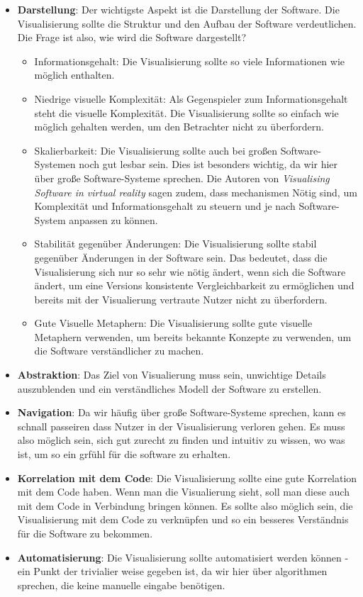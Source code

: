 \begin{itemize}
    \item \textbf{Darstellung}: Der wichtigste Aspekt ist die Darstellung der Software. Die Visualisierung sollte die Struktur und den Aufbau der Software verdeutlichen. Die Frage ist also, wie wird die Software dargestellt? 
    \begin{itemize}
        \item Informationsgehalt: Die Visualisierung sollte so viele Informationen wie möglich enthalten.
        \item Niedrige visuelle Komplexität: Als Gegenspieler zum Informationsgehalt steht die visuelle Komplexität. Die Visualisierung sollte so einfach wie möglich gehalten werden, um den Betrachter nicht zu überfordern.
        \item Skalierbarkeit: Die Visualisierung sollte auch bei großen Software-Systemen noch gut lesbar sein. Dies ist besonders wichtig, da wir hier über große Software-Systeme sprechen. Die Autoren von \textit{Visualising Software in virtual reality} \cite{visSoftwareVR} sagen zudem, dass mechanismen Nötig sind, um Komplexität und Informationsgehalt zu steuern und je nach Software-System anpassen zu können.
        \item Stabilität gegenüber Änderungen: Die Visualisierung sollte stabil gegenüber Änderungen in der Software sein. Das bedeutet, dass die Visualisierung sich nur so sehr wie nötig ändert, wenn sich die Software ändert, um eine Versions konsistente Vergleichbarkeit zu ermöglichen und bereits mit der Visualierung vertraute Nutzer nicht zu überfordern.
        \item Gute Visuelle Metaphern: Die Visualisierung sollte gute visuelle Metaphern verwenden, um bereits bekannte Konzepte zu verwenden, um die Software verständlicher zu machen.
    \end{itemize}
    \item \textbf{Abstraktion}: Das Ziel von Visualierung muss sein, unwichtige Details auszublenden und ein verständliches Modell der Software zu erstellen.
    \item \textbf{Navigation}: Da wir häufig über große Software-Systeme sprechen, kann es schnall passeiren dass Nutzer in der Visualisierung verloren gehen. Es muss also möglich sein, sich gut zurecht zu finden und intuitiv zu wissen, wo was ist, um so ein grfühl für die software zu erhalten.
    \item \textbf{Korrelation mit dem Code}: Die Visualisierung sollte eine gute Korrelation mit dem Code haben. Wenn man die Visualierung sieht, soll man diese auch mit dem Code in Verbindung bringen können. Es sollte also möglich sein, die Visualisierung mit dem Code zu verknüpfen und so ein besseres Verständnis für die Software zu bekommen.
    \item \textbf{Automatisierung}: Die Visualisierung sollte automatisiert werden können - ein Punkt der trivialier weise gegeben ist, da wir hier über algorithmen sprechen, die keine manuelle eingabe benötigen.
\end{itemize}


